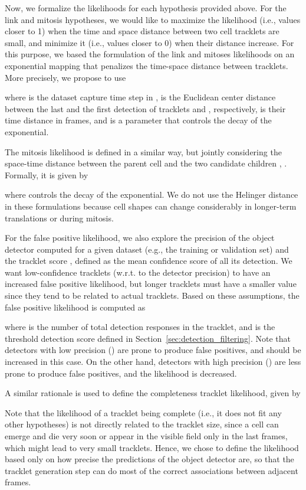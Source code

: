 \documentclass{article}
\begin{document}
Now, we formalize the likelihoods for each hypothesis provided above. For the link and mitosis hypotheses, we would like to maximize the likelihood (i.e., values closer to 1) when the time and space distance between two cell tracklets are small, and minimize it (i.e., values closer to 0) when their distance increase. For this purpose, we based the formulation of the link and mitoses likelihoods on an exponential mapping that penalizes the time-space distance between tracklets. More precisely, we propose to use

where  is the dataset capture time step in ,  is the Euclidean center distance between the last and the first detection of tracklets  and , respectively,  is their time distance in frames, and  is a parameter that controls the decay of the exponential.

The mitosis likelihood is defined in a similar way, but jointly considering the space-time distance between the parent cell  and the two candidate children , . Formally, it is given by

where  controls the decay of the exponential. We do not use the Helinger distance in these formulations because cell shapes can change considerably in longer-term translations or during mitosis.

For the false positive likelihood, we also explore the precision  of the object detector computed for a given dataset (e.g., the training or validation set) and the tracklet score , defined as the mean confidence score of all its detection. We want low-confidence tracklets (w.r.t. to the detector precision) to have an increased false positive likelihood, but longer tracklets must have a smaller value since they tend to be related to actual tracklets. Based on these assumptions, the false positive likelihood is computed as

where  is the number of total detection responses in the tracklet, and  is the threshold detection score defined in Section~\ref{sec:detection_filtering}. Note that detectors with low precision () are prone to produce false positives, and  should be increased in this case. On the other hand, detectors with high precision () are less prone to produce false positives, and the likelihood  is decreased.

A similar rationale is used to define the completeness tracklet likelihood, given by

Note that the likelihood of a tracklet being complete (i.e., it does not fit any other hypotheses) is not directly related to the tracklet size, since a cell can emerge and die very soon or appear in the visible field only in the last frames, which might lead to very small tracklets. Hence, we chose to define the likelihood based only on how precise the predictions of the object detector are, so that the tracklet generation step can do most of the correct associations between adjacent frames.
\end{document}
